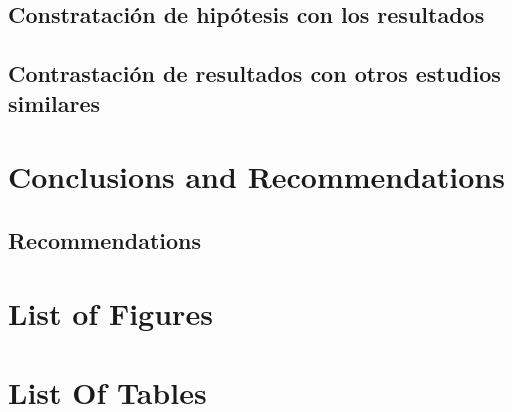 \documentclass[12pt,a4paper,oneside]{report}
\begin{document}
\section{Constratación de hipótesis con los resultados}

\section{Contrastación de resultados con otros estudios similares}


\chapter{Conclusions and Recommendations}

\section{Recommendations}



\printbibliography[heading=bibintoc]


\appendix
\clearpage
\addappheadtotoc
\appendixpage

\chapter{List of Figures}

\chapter{List Of Tables}
\end{document}
